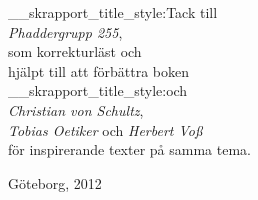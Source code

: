 \documentclass[lang=sv,ptsize=10pt,font=none,nomath,titles=bf,../../a4.tex]{subfiles}
\begin{document}
\pagestyle{empty}

\begin{titlepage} %
	\maketitle[hide={date,email}]
	\begin{abstract}
		En inkomplett guide till att skriva och typsätta \LaTeX-dokument riktad
		till studenter på Chalmers Tekniska Högskola, specifikt programmen
		Teknisk Matematik och Teknisk Fysik.
		Inspiration har tagits från bland annat  och
		, men främst från .
	\end{abstract}
\end{titlepage} %
\cleardoublepage

\begin{center} %
	\large\vspace*{36pt}

	{\csname__skrapport_title_style:\endcsname\Large Tack till}\\[1ex]
	\emph{Phaddergrupp 255},\\
	som korrekturläst och\\
	hjälpt till att förbättra boken\\[1ex]
	{\csname__skrapport_title_style:\endcsname\Large och}\\[1ex]
	\emph{Christian von Schultz},\\
	\emph{Tobias Oetiker} och \emph{Herbert Voß}\\
	för inspirerande texter på samma tema.
	\vfill 
	
	\small
	Göteborg, 2012
\end{center}
\end{document}

